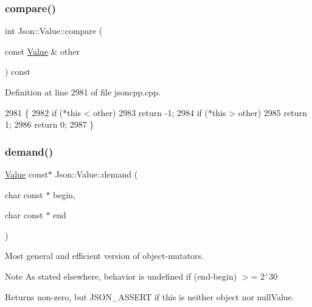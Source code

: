 \subsubsection{\texorpdfstring{compare()}{compare()}}
{\footnotesize\ttfamily int Json\+::\+Value\+::compare (\begin{DoxyParamCaption}\item[{const \hyperlink{class_json_1_1_value}{Value} \&}]{other }\end{DoxyParamCaption}) const}



Definition at line 2981 of file jsoncpp.\+cpp.


\begin{DoxyCode}
2981                                            \{
2982   \textcolor{keywordflow}{if} (*\textcolor{keyword}{this} < other)
2983     \textcolor{keywordflow}{return} -1;
2984   \textcolor{keywordflow}{if} (*\textcolor{keyword}{this} > other)
2985     \textcolor{keywordflow}{return} 1;
2986   \textcolor{keywordflow}{return} 0;
2987 \}
\end{DoxyCode}
\mbox{\label{class_json_1_1_value_afeb7ff596a0929d90c5f2f3cffb413ed}} 
\subsubsection{\texorpdfstring{demand()}{demand()}}
{\footnotesize\ttfamily \hyperlink{class_json_1_1_value}{Value} const$\ast$ Json\+::\+Value\+::demand (\begin{DoxyParamCaption}\item[{char const $\ast$}]{begin,  }\item[{char const $\ast$}]{end }\end{DoxyParamCaption})}

Most general and efficient version of object-\/mutators. \begin{DoxyNote}{Note}
As stated elsewhere, behavior is undefined if (end-\/begin) $>$= 2$^\wedge$30 
\end{DoxyNote}
\begin{DoxyReturn}{Returns}
non-\/zero, but J\+S\+O\+N\+\_\+\+A\+S\+S\+E\+RT if this is neither object nor null\+Value. 
\end{DoxyReturn}
\mbox{\label{class_json_1_1_value_a0519a551e37ee6665d74742b3f96bab3}} 
